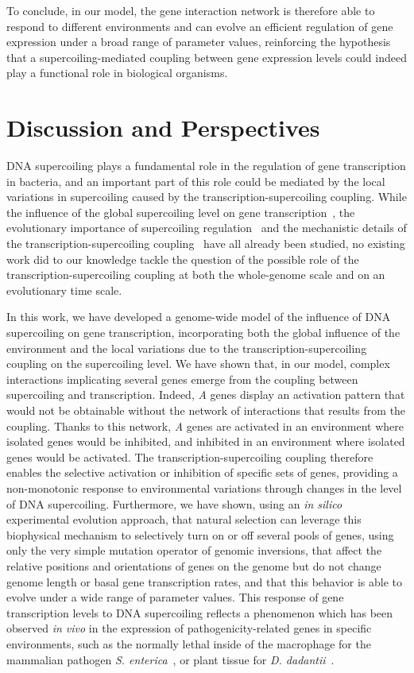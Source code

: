 To conclude, in our model, the gene interaction network is therefore able to respond to different environments and can evolve an efficient regulation of gene expression under a broad range of parameter values, reinforcing the hypothesis that a supercoiling-mediated coupling between gene expression levels could indeed play a functional role in biological organisms.

\section{Discussion and Perspectives}

DNA supercoiling plays a fundamental role in the regulation of gene transcription in bacteria, and an important part of this role could be mediated by the local variations in supercoiling caused by the transcription-supercoiling coupling.
While the influence of the global supercoiling level on gene transcription~\citep{lal2016, ma2016,dorman2016, martisb.2019}, the evolutionary importance of supercoiling regulation~\citep{crozat2005,crozat2010, duprey2021} and the mechanistic details of the transcription-supercoiling coupling~\citep{meyer2014, elhoudaigui2019} have all already been studied, no existing work did to our knowledge tackle the question of the possible role of the transcription-supercoiling coupling at both the whole-genome scale and on an evolutionary time scale.

In this work, we have developed a genome-wide model of the influence of DNA supercoiling on gene transcription, incorporating both the global influence of the environment and the local variations due to the transcription-supercoiling coupling on the supercoiling level.
We have shown that, in our model, complex interactions implicating several genes emerge from the coupling between supercoiling and transcription.
Indeed, \emph{A} genes display an activation pattern that would not be obtainable without the network of interactions that results from the coupling.
Thanks to this network, \emph{A} genes are activated in an environment where isolated genes would be inhibited, and inhibited in an environment where isolated genes would be activated.
The transcription-supercoiling coupling therefore enables the selective activation or inhibition of specific sets of genes, providing a non-monotonic response to environmental variations through changes in the level of DNA supercoiling.
Furthermore, we have shown, using an \emph{in silico} experimental evolution approach, that natural selection can leverage this biophysical mechanism to selectively turn on or off several pools of genes, using only the very simple mutation operator of genomic inversions, that affect the relative positions and orientations of genes on the genome but do not change genome length or basal gene transcription rates, and that this behavior is able to evolve under a wide range of parameter values.
This response of gene transcription levels to DNA supercoiling reflects a phenomenon which has been observed \emph{in vivo} in the expression of pathogenicity-related genes in specific environments, such as the normally lethal inside of the macrophage for the mammalian pathogen \emph{S. enterica}~\citep{cameron2013}, or plant tissue for \emph{D. dadantii}~\citep{herault2014}.

